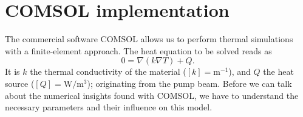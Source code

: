 \section{COMSOL implementation}
\label{app:comsol_deriv}

The commercial software COMSOL
allows us to perform thermal simulations
with a finite-element approach.
The heat equation
to be solved
reads as
\begin{equation}
0 = \nabla(k\nabla T) + Q.
\label{eq:app:heateq}
\end{equation}
It is $k$ the thermal conductivity of the material
($[k]=\mathrm{m}^{-1}$),
and $Q$ the heat source
($[Q]=\mathrm{W}/\mathrm{m}^3$);
originating from the pump beam.
Before we can talk about
the numerical insights
found with COMSOL,
we have to understand
the necessary parameters
and their influence
on this model.





